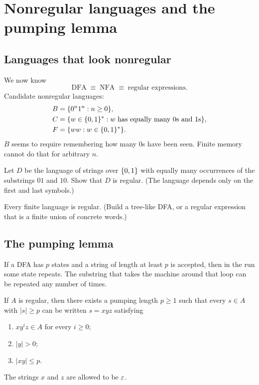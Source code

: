 \section{Nonregular languages and the pumping lemma}

\subsection{Languages that look nonregular}
We now know
\[
  \text{DFA}\;\equiv\;\text{NFA}\;\equiv\;\text{regular expressions}.
\]
Candidate nonregular languages:
\[
\begin{aligned}
  B&=\{0^n1^n:n\geq 0\},\\
  C&=\{w\in\{0,1\}^*:w\text{ has equally many }0\text{s and }1\text{s}\},\\
  F&=\{ww:w\in\{0,1\}^*\}.
\end{aligned}
\]
$B$ seems to require remembering how many $0$s have been seen. Finite memory
cannot do that for arbitrary $n$.

\begin{exercise}
Let $D$ be the language of strings over $\{0,1\}$ with equally many
occurrences of the substrings $01$ and $10$. Show that $D$ is regular.
(The language depends only on the first and last symbols.)
\end{exercise}

\begin{exercise}
Every finite language is regular. (Build a tree-like DFA, or a regular
expression that is a finite union of concrete words.)
\end{exercise}

\subsection{The pumping lemma}
If a DFA has $p$ states and a string of length at least $p$ is accepted, then
in the run some state repeats. The substring that takes the machine around
that loop can be repeated any number of times.

\begin{lemma}
If $A$ is regular, then there exists a pumping length $p\geq 1$ such that every
$s\in A$ with $|s|\geq p$ can be written $s=xyz$ satisfying
\begin{enumerate}
  \item $xy^iz\in A$ for every $i\geq 0$;
  \item $|y|>0$;
  \item $|xy|\leq p$.
\end{enumerate}
The strings $x$ and $z$ are allowed to be $\varepsilon$.
\end{lemma}

